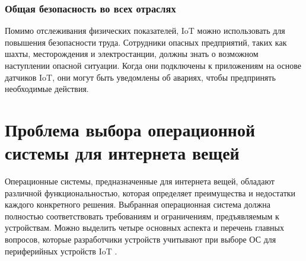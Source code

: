 \subsubsection{Общая безопасность во всех отраслях}

Помимо отслеживания физических показателей, IoT можно использовать для повышения безопасности труда. Сотрудники опасных предприятий, таких как шахты, месторождения и электростанции, должны знать о возможном наступлении опасной ситуации. Когда они подключены к приложениям на основе датчиков IoT, они могут быть уведомлены об авариях, чтобы предпринять необходимые действия.



\section{Проблема выбора операционной системы для интернета вещей}

Операционные системы, предназначенные для интернета вещей, обладают различной функциональностью, которая определяет преимущества и недостатки каждого конкретного решения. Выбранная операционная система должна полностью соответствовать требованиям и ограничениям, предъявляемым к устройствам. Можно выделить четыре основных аспекта и перечень главных вопросов, которые разработчики устройств учитывают при выборе ОС для периферийных устройств IoT \cite{OS_questions}.




